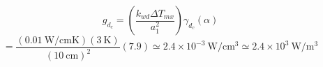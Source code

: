 \begin{equation}%
g_{d_c}=(\frac{k_{wd}\Delta T_{mx}}{a_1^2})\gamma_{d_c}(\alpha)
\end{equation}
\begin{equation}%
=\frac{(0.01\ \mathrm{W/cmK})(3\ \mathrm{K})}{(10\ \mathrm{cm})^2}(7.9)\simeq2.4\times10^{-3}\ \mathrm{W/cm^3}\simeq2.4\times10^3\ \mathrm{W/m^3}
\end{equation}


